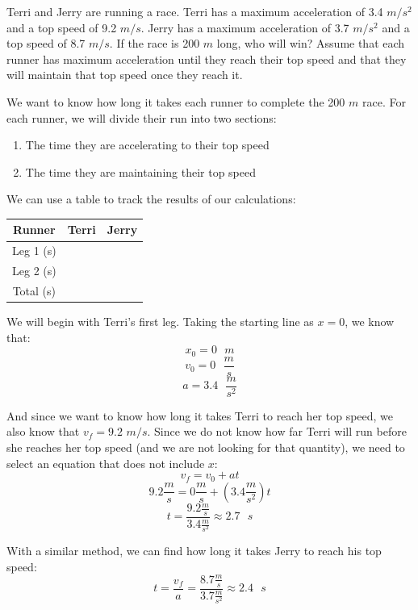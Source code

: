 \begin{Worked}
\begin{Problem}
Terri and Jerry are running a race. Terri has a maximum 
acceleration of 3.4 $m/s^2$ and a top speed of 9.2 $m/s$. Jerry has a maximum 
acceleration of 3.7 $m/s^2$ and a top speed of 8.7 $m/s$. If the race is 200 $m$ 
long, who will win? Assume that each runner has maximum acceleration until they 
reach their top speed and that they will maintain that top speed once they reach 
it. 
\end{Problem}
\begin{Solution}
We want to know how long it takes each runner to complete the 
200 $m$ race. For each runner, we will divide their run into two sections:
\begin{enumerate}
\item The time they are accelerating to their top speed
\item The time they are maintaining their top speed
\end{enumerate}

We can use a table to track the results of our calculations:
\begin{center}
\begin{tabular}{|c|c|c|}
\hline
Runner & Terri & Jerry\\\hline
Leg 1 (s) & & \\\hline
Leg 2 (s) & & \\\hline
Total (s) & & \\\hline
\end{tabular}
\end{center}

We will begin with Terri's first leg. Taking the starting line as $x = 0$, we know 
that:
$$x_0 = 0\text{ }m$$
$$v_0 = 0\text { } \frac{m}{s}$$
$$a = 3.4\text{ }\frac{m}{s^2}$$

And since we want to know how long it takes Terri to reach her top speed, we 
also know that $v_f = 9.2$ $m/s$. Since we do not know how far Terri will run 
before she reaches her top speed (and we are not looking for that quantity), we 
need to select an equation that does not include $x$:
$$v_f = v_0 + at$$
$$9.2 \frac{m}{s} = 0 \frac{m}{s} + \left(3.4 \frac{m}{s^2} \right)t$$
$$t = \frac{9.2 \frac{m}{s}}{3.4 \frac{m}{s^2}} \approx 2.7\text{ }s$$

With a similar method, we can find how long it takes Jerry to reach his top 
speed:
$$t = \frac{v_f}{a} = \frac{8.7 \frac{m}{s}}{3.7 \frac{m}{s^2}} \approx 2.4
\text{ }s$$


\end{Solution}
\end{Worked}

